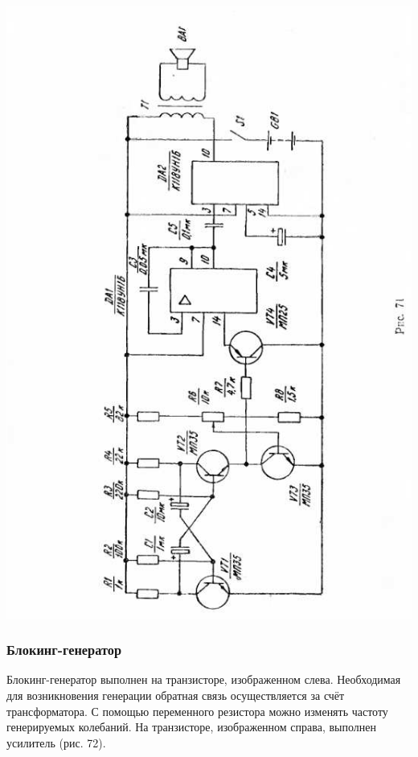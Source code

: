 \documentclass[12pt]{article}
\begin{document}
\includegraphics[scale=0.8, angle=0]{ekon3_072_1}

\newpage

\subsubsection{Блокинг-генератор}

Блокинг-генератор выполнен на транзисторе, изображенном слева. Необходимая для возникновения генерации обратная связь осуществляется за счёт трансформатора. С помощью переменного резистора можно изменять частоту генерируемых колебаний. На транзисторе, изображенном справа, выполнен усилитель (рис. 72).

\vspace{1.5cm}
\end{document}
